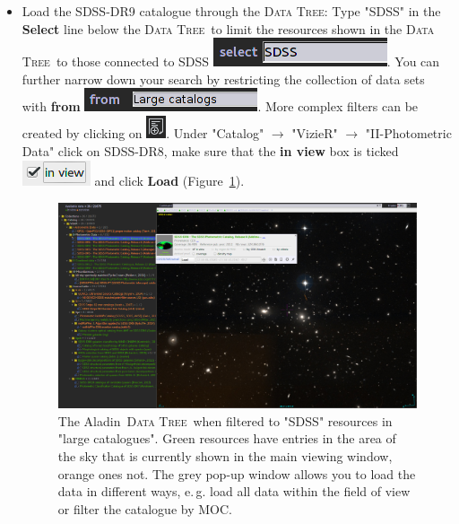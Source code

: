 \documentclass [a4paper, 12pt]{article}
\newcommand{\aladin}{{\textsc{A}{ladin}}}
\newcommand{\datatree}{\textsc{Data Tree}}
\begin{document}
\begin{itemize}
\item Load the SDSS-DR9 catalogue through the \datatree: Type "SDSS" in the 
\textbf{Select} line below the \datatree\ to limit the resources shown in the 
\datatree\ to those connected to SDSS \includegraphics[width=0.2 
\textwidth]{../images/aladin_select_SDSS.png}. You can further narrow down your 
search by restricting the collection of data sets with \textbf{from}  
\includegraphics[width=0.2 
\textwidth]{../images/aladin_selectfrom_largecatalogues.png}. More complex 
filters can be created by clicking on \includegraphics[width=0.03 
\textwidth]{../images/aladin_button_filtertree.png}. Under "Catalog" 
$\rightarrow$ "VizieR" $\rightarrow$ "II-Photometric Data" click on SDSS-DR8, 
make sure that the \textbf{in view} box is ticked \includegraphics[width=0.07 
\textwidth]{../images/aladin_load_inview.png} and click \textbf{Load} 
(Figure~\ref{fig:aladinSDSS}).

\begin{figure}[H]
\center
\includegraphics[width=0.85  
\textwidth]{../images/aladin_load_sdss_a1656.png}
\caption{The \aladin\ \datatree\ when filtered to "SDSS" resources in "large 
catalogues". Green resources have entries in the area of the sky that is 
currently shown in the main viewing window, orange ones not. The grey pop-up 
window allows you to load the data in different ways, e.\,g. load all data 
within the field of view or filter the catalogue by MOC. }
\label{fig:aladinSDSS}
\end{figure}


\end{itemize}
\end{document}
